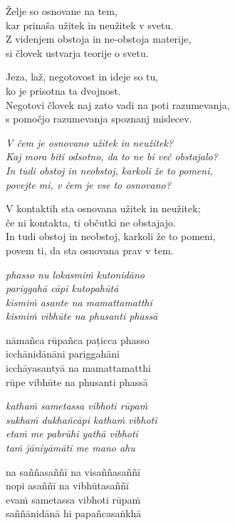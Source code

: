 Želje so osnovane na tem,\\
kar prinaša užitek in neužitek v svetu.\\
Z videnjem obstoja in ne-obstoja materije,\\
si človek ustvarja teorije o svetu.

Jeza, laž, negotovost in ideje so tu,\\
ko je prisotna ta dvojnost.\\
Negotovi človek naj zato vadi na poti razumevanja,\\
s pomočjo razumevanja spoznanj mislecev.

\emph{V čem je osnovano užitek in neužitek?}\\
\emph{Kaj mora biti odsotno, da to ne bi več obstajalo?}\\
\emph{In tudi obstoj in neobstoj, karkoli že to pomeni,}\\
\emph{povejte mi, v čem je vse to osnovano?}

V kontaktih sta osnovana užitek in neužitek;\\
če ni kontakta, ti občutki ne obstajajo.\\
In tudi obstoj in neobstoj, karkoli že to pomeni,\\
povem ti, da sta osnovana prav v tem.


\clearpage

\emph{phasso nu lokasmiṁ kutonidāno\\
pariggahā cāpi kutopahūtā}\\
\emph{kismiṁ asante na mamattamatthi\\
kismiṁ vibhūte na phusanti phassā}

nāmañca rūpañca paṭicca phasso\\
icchānidānāni pariggahāni\\
icchāyasantyā na mamattamatthi\\
rūpe vibhūte na phusanti phassā

\emph{kathaṁ sametassa vibhoti rūpaṁ\\
sukhaṁ dukhañcāpi kathaṁ vibhoti}\\
\emph{etaṁ me pabrūhi yathā vibhoti\\
taṁ jāniyāmāti me mano ahu}

na saññasaññī na visaññasaññī\\
nopi asaññī na vibhūtasaññī\\
evaṁ sametassa vibhoti rūpaṁ\\
saññānidānā hi papañcasaṅkhā


